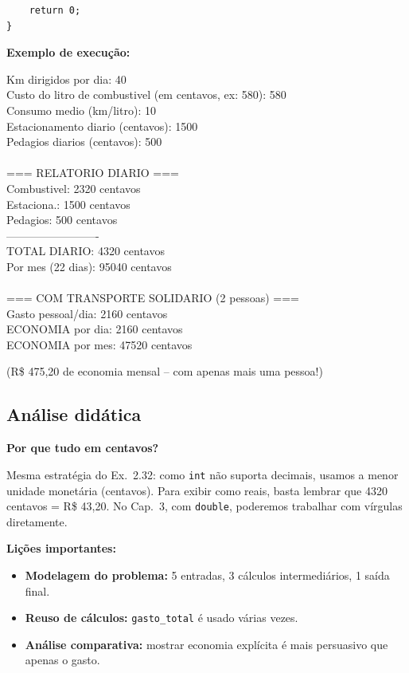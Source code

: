 \documentclass[12pt,a4paper]{article}
\begin{document}
\begin{respostabox}
\begin{lstlisting}
    return 0;
}
\end{lstlisting}

\textbf{Exemplo de execução:}
\begin{saida}
Km dirigidos por dia: 40\\
Custo do litro de combustivel (em centavos, ex: 580): 580\\
Consumo medio (km/litro): 10\\
Estacionamento diario (centavos): 1500\\
Pedagios diarios (centavos): 500\\
\\
=== RELATORIO DIARIO ===\\
Combustivel: 2320 centavos\\
Estaciona.:  1500 centavos\\
Pedagios:    500 centavos\\
-------------------------\\
TOTAL DIARIO:        4320 centavos\\
Por mes (22 dias):   95040 centavos\\
\\
=== COM TRANSPORTE SOLIDARIO (2 pessoas) ===\\
Gasto pessoal/dia:   2160 centavos\\
ECONOMIA por dia:    2160 centavos\\
ECONOMIA por mes:    47520 centavos
\end{saida}

(R\$ 475,20 de economia mensal -- com apenas mais uma pessoa!)
\end{respostabox}

\subsection*{Análise didática}

\begin{atencao}
\textbf{Por que tudo em centavos?}

Mesma estratégia do Ex.\ 2.32: como \texttt{int} não suporta decimais, usamos a
menor unidade monetária (centavos). Para exibir como reais, basta lembrar que
4320 centavos = R\$ 43,20. No Cap.~3, com \texttt{double}, poderemos trabalhar
com vírgulas diretamente.

\textbf{Lições importantes:}
\begin{itemize}[noitemsep]
  \item \textbf{Modelagem do problema:} 5 entradas, 3 cálculos intermediários, 1 saída final.
  \item \textbf{Reuso de cálculos:} \texttt{gasto\_total} é usado várias vezes.
  \item \textbf{Análise comparativa:} mostrar economia explícita é mais
  persuasivo que apenas o gasto.
\end{itemize}
\end{atencao}
\end{document}
